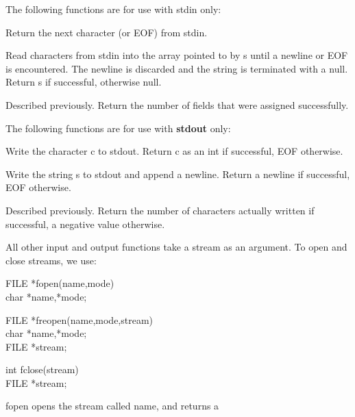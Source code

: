      The following functions are for use with {\fn stdin} only:
\begin{hanglist}
	Return the next character (or {\cd EOF}) from {\fn stdin}.

	Read characters from {\fn stdin} into the array pointed to by
	{\cd s} until a newline or {\cd EOF} is encountered.  The newline is
	discarded and the string is terminated with a null.  Return
	{\cd s} if successful, otherwise null.

	Described previously.  Return the number of fields that were
	assigned successfully.
\end{hanglist}
     The following functions are for use with {\bf stdout} only:
\begin{hanglist}
	Write the character {\cd c} to {\fn stdout}.  Return {\cd c} as
	an {\cd int} if successful, {\cd EOF} otherwise.

	Write the string {\cd s} to {\fn stdout} and append a newline.  
	Return a newline if successful, {\cd EOF} otherwise.

 
	Described previously.  Return the number of characters actually
	written if successful, a negative value otherwise.
\end{hanglist}
     All other  input and  output functions  take a  stream as an
argument. To open and close streams, we use:
\begin{code}
       FILE *fopen(name,mode)		 \\
       char *name,*mode;		 \addVspace

       FILE *freopen(name,mode,stream)	 \\
       char *name,*mode;		 \\
       FILE *stream;			 \addVspace

       int fclose(stream)		 \\
       FILE *stream;
\end{code}
\noindent
     {\cd fopen} opens the stream called {\cd name}, and returns a
